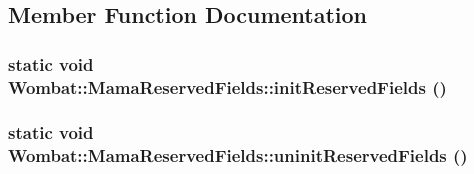 \subsection{Member Function Documentation}
\hypertarget{classWombat_1_1MamaReservedFields_a854650a414cad5b1614d7a54297d6bdf}{
\subsubsection[{initReservedFields}]{\setlength{\rightskip}{0pt plus 5cm}static void Wombat::MamaReservedFields::initReservedFields ()}}
\label{classWombat_1_1MamaReservedFields_a854650a414cad5b1614d7a54297d6bdf}
\hypertarget{classWombat_1_1MamaReservedFields_ae99847ee37db0da80f5ee7b52c96c31f}{
\subsubsection[{uninitReservedFields}]{\setlength{\rightskip}{0pt plus 5cm}static void Wombat::MamaReservedFields::uninitReservedFields ()}}
\label{classWombat_1_1MamaReservedFields_ae99847ee37db0da80f5ee7b52c96c31f}


